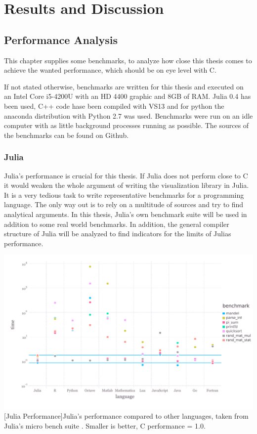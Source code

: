 \section{Results and Discussion}

\subsection{Performance Analysis}
This chapter supplies some benchmarks, to analyze how close this thesis comes to achieve the wanted performance, which should be on eye level with C.

If not stated otherwise, benchmarks are written for this thesis and executed on an Intel Core i5-4200U with an HD 4400 graphic and 8GB of RAM.
Julia 0.4 has been used, C++ code hase been compiled with VS13 and for python the anaconda distribution with Python 2.7 was used.
Benchmarks were run on an idle computer with as little background processes running as possible.
The sources of the benchmarks can be found on Github.

\subsubsection{Julia}

Julia's performance is crucial for this thesis. 
If Julia does not perform close to C it would weaken the whole argument of writing the visualization library in Julia.
It is a very tedious task to write representative benchmarks for a programming language. 
The only way out is to rely on a multitude of sources and try to find analytical arguments.
In this thesis, Julia's own benchmark suite will be used in addition to some real world benchmarks.
In addition, the general compiler structure of Julia will be analyzed to find indicators for the limits of Julias performance.

\vspace{1em}
\begin{minipage}{\linewidth}
    \centering
    \includegraphics[width=0.9\linewidth]{graphics/juliabench.pdf}
    [Julia Performance]{Julia's performance compared to other languages, taken from Julia's micro bench suite \cite{JuliaBench}. Smaller is better, C performance = 1.0.}
    \label{fig:juliabench}
\end{minipage}

